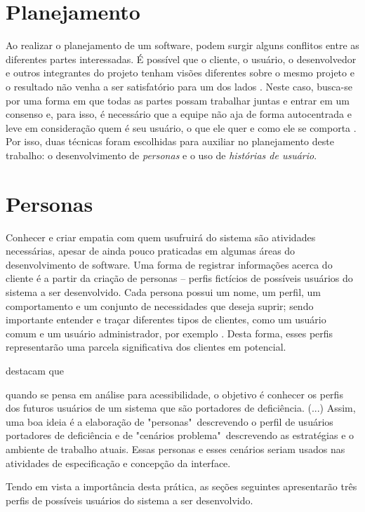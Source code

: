 \section{Planejamento}
Ao realizar o planejamento de um software, podem surgir alguns conflitos entre as diferentes partes interessadas. É possível que o cliente, o usuário, o desenvolvedor e outros integrantes do projeto tenham visões diferentes sobre o mesmo projeto e o resultado não venha a ser satisfatório para um dos lados \cite{COHN2004}. Neste caso, busca-se por uma forma em que todas as partes possam trabalhar juntas e entrar em um consenso e, para isso, é necessário que a equipe não aja de forma autocentrada e leve em consideração quem é seu usuário, o que ele quer e como ele se comporta \cite{AUDY2015}. Por isso, duas técnicas foram escolhidas para auxiliar no planejamento deste trabalho: o desenvolvimento de \textit{personas} e o uso de \textit{histórias de usuário}.


\section{Personas}

Conhecer e criar empatia com quem usufruirá do sistema são atividades necessárias, apesar de ainda pouco praticadas em algumas áreas do desenvolvimento de software. Uma forma de registrar informações acerca do cliente é a partir da criação de personas -- perfis fictícios de possíveis usuários do sistema a ser desenvolvido. Cada persona possui um nome, um perfil, um comportamento e um conjunto de necessidades que deseja suprir; sendo importante entender e traçar diferentes tipos de clientes, como um usuário comum e um usuário administrador, por exemplo \cite{AUDY2015}. Desta forma, esses perfis representarão uma parcela significativa dos clientes em potencial.

\cite{ERGO2015} destacam que
\begin{directcite}
    quando se pensa em análise para acessibilidade, o objetivo é conhecer os perfis dos futuros usuários de um sistema que são portadores de deficiência. (...) Assim, uma boa ideia é a elaboração de "personas"\ descrevendo o perfil de usuários portadores de deficiência e de "cenários problema"\ descrevendo as estratégias e o ambiente de trabalho atuais. 
    Essas personas e esses cenários seriam usados nas atividades de especificação e concepção da interface.
\end{directcite}
Tendo em vista a importância desta prática, as seções seguintes apresentarão três perfis de possíveis usuários do sistema a ser desenvolvido.

